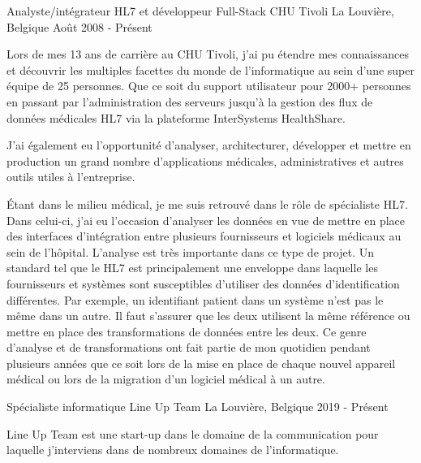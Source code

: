 

\begin{cventries}

  \cventry
    {Analyste/intégrateur HL7 et développeur Full-Stack} %
    {CHU Tivoli} %
    {La Louvière, Belgique} %
    {Août 2008 - Présent} %
    {
    Lors de mes 13 ans de carrière au CHU Tivoli, j'ai pu étendre mes connaissances et découvrir les multiples facettes du monde de l'informatique au sein d'une super équipe de 25 personnes.
    Que ce soit du support utilisateur pour 2000+ personnes en passant par l'administration des serveurs jusqu'à la gestion des flux de données médicales HL7 via la plateforme InterSystems HealthShare.
    
    J'ai également eu l'opportunité d'analyser, architecturer, développer et mettre en production un grand nombre d'applications médicales, administratives et autres outils utiles à l'entreprise.
    
    Étant dans le milieu médical, je me suis retrouvé dans le rôle de spécialiste HL7. Dans celui-ci, j'ai eu l'occasion d'analyser les données en vue de mettre en place des interfaces d'intégration entre plusieurs fournisseurs et logiciels médicaux au sein de l'hôpital.
    L'analyse est très importante dans ce type de projet.
    Un standard tel que le HL7 est principalement une enveloppe dans laquelle les fournisseurs et systèmes sont susceptibles d'utiliser des données d'identification différentes. Par exemple, un identifiant patient dans un système n'est pas le même dans un autre. Il faut s'assurer que les deux utilisent la même référence ou mettre en place des transformations de données entre les deux. Ce genre d'analyse et de transformations ont fait partie de mon quotidien pendant plusieurs années que ce soit lors de la mise en place de chaque nouvel appareil médical ou lors de la migration d'un logiciel médical à un autre.
    
    }

  \cventry
    {Spécialiste informatique} %
    {Line Up Team} %
    {La Louvière, Belgique} %
    {2019 - Présent} %
    {
    Line Up Team est une start-up dans le domaine de la communication pour laquelle j'interviens dans de nombreux domaines de l'informatique.
    
}
\end{cventries}
